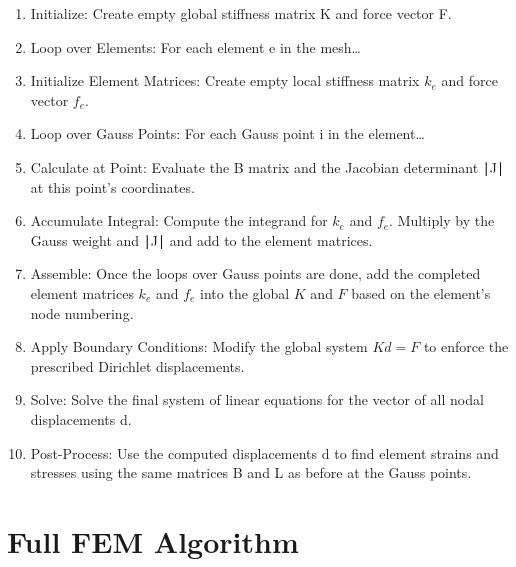 \documentclass[
  11pt,
  a4paper,
]{scrbook}
\begin{document}
\begin{enumerate}
\def\labelenumi{\arabic{enumi}.}
\item
  Initialize: Create empty global stiffness matrix K and force vector F.
\item
  Loop over Elements: For each element e in the mesh\ldots{}
\item
  Initialize Element Matrices: Create empty local stiffness matrix
  \(k_e\) and force vector \(f_e\).
\item
  Loop over Gauss Points: For each Gauss point i in the element\ldots{}
\item
  Calculate at Point: Evaluate the B matrix and the Jacobian determinant
  ∣J∣ at this point's coordinates.
\item
  Accumulate Integral: Compute the integrand for \(k_e\) and \(f_e\).
  Multiply by the Gauss weight and ∣J∣ and add to the element matrices.
\item
  Assemble: Once the loops over Gauss points are done, add the completed
  element matrices \(k_e\) and \(f_e\) into the global \(K\) and \(F\)
  based on the element's node numbering.
\item
  Apply Boundary Conditions: Modify the global system \(K d = F\) to
  enforce the prescribed Dirichlet displacements.
\item
  Solve: Solve the final system of linear equations for the vector of
  all nodal displacements d.
\item
  Post-Process: Use the computed displacements d to find element strains
  and stresses using the same matrices B and L as before at the Gauss
  points.
\end{enumerate}

\section{Full FEM Algorithm}\label{full-fem-algorithm}
\end{document}
